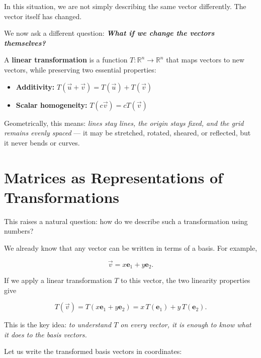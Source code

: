 \documentclass[11pt,openany]{book}
\theoremstyle{definition}
\begin{document}
\medskip

In this situation, we are not simply describing the same vector differently. 
The vector itself has changed.

\medskip



We now ask a different question: \textbf{\textit{What if we change the vectors themselves?}}


\medskip

A \textbf{linear transformation} is a function $T: \mathbb{R}^n \to \mathbb{R}^n$ that maps vectors 
to new vectors, while preserving two essential properties:

\begin{itemize}
  \item \textbf{Additivity:} $T(\vec{u} + \vec{v}) = T(\vec{u}) + T(\vec{v})$
  \item \textbf{Scalar homogeneity:} $T(c\vec{v}) = cT(\vec{v})$
\end{itemize}

Geometrically, this means: \textit{lines stay lines, the origin stays fixed, and the grid 
remains evenly spaced} --- it may be stretched, rotated, sheared, or reflected, but it 
never bends or curves.

\section{Matrices as Representations of Transformations}

This raises a natural question: how do we describe such a transformation using numbers?

\medskip

We already know that any vector can be written in terms of a basis. For example,

\[
\vec{v} = x\mathbf{e}_1 + y\mathbf{e}_2.
\]

If we apply a linear transformation $T$ to this vector, the two linearity properties give

\[
T(\vec{v}) = T(x\mathbf{e}_1 + y\mathbf{e}_2) = x\,T(\mathbf{e}_1) + y\,T(\mathbf{e}_2).
\]

This is the key idea: \textit{to understand $T$ on every vector, it is enough to know 
what it does to the basis vectors.}

\medskip

Let us write the transformed basis vectors in coordinates:
\end{document}

